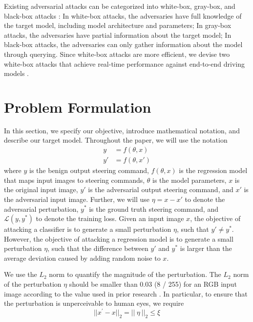 Existing adversarial attacks can be categorized into white-box, gray-box, and black-box attacks \citep{REN2020346}: In white-box attacks, the adversaries have full knowledge of the target model, including model architecture and parameters; In gray-box attacks, the adversaries have partial information about the target model; In black-box attacks, the adversaries can only gather information about the model through querying. Since white-box attacks are more efficient, we devise two white-box attacks that achieve real-time performance against end-to-end driving models .


\section{Problem Formulation}
\label{section_problem_formulation}

In this section, we specify our objective, introduce mathematical notation, and describe our target model. Throughout the paper, we will use the notation
\begin{align}
y&=f(\theta, x) \\
y'&=f(\theta, x')
\end{align}
where $y$ is the benign output steering command, $f(\theta, x)$ is the regression model that maps input images to steering commands, $\theta$ is the model parameters, $x$ is the original input image, $y'$ is the adversarial output steering command, and $x'$ is the adversarial input image. Further, we will use $\eta=x-x'$ to denote the adversarial perturbation, $y^{*}$ is the ground truth steering command, and $\mathcal{L}(y, y^{*})$ to denote the training loss. Given an input image $x$, the objective of attacking a classifier is to generate a small perturbation $\eta$, such that $y' \neq y^{*}$. However, the objective of attacking a regression model is to generate a small perturbation $\eta$, such that the difference between $y'$ and $y^{*}$ is larger than the average deviation caused by adding random noise to $x$. 

We use the $L_2$ norm to quantify the magnitude of the perturbation. The $L_2$ norm of the perturbation $\eta$ should be smaller than 0.03 (8 / 255) for an RGB input image according to the value used in prior research \citep{chow2020adversarial} \citep{ACFH2020square}. In particular, to ensure that the perturbation is unperceivable to human eyes, we require \begin{equation}
||x^{'}-x||_{2} = ||\ {\eta}\ ||_{2} \leq \xi %
\end{equation}

